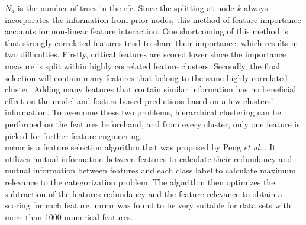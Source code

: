 $N_d$ is the number of trees in the \ac{rfc}. Since the splitting at node $k$ always incorporates the information from prior nodes, this method of feature importance accounts for non-linear feature interaction. One shortcoming of this method is that strongly correlated features tend to share their importance, which results in two difficulties. Firstly, critical features are scored lower since the importance measure is split within highly correlated feature clusters. Secondly, the final selection will contain many features that belong to the same highly correlated cluster. Adding many features that contain similar information has no beneficial effect on the model and fosters biased predictions based on a few clusters' information. To overcome these two problems, hierarchical clustering can be performed on the features beforehand, and from every cluster, only one feature is picked for further feature engineering.\\
\ac{mrmr} is a feature selection algorithm that was proposed by Peng \textit{et al.}.\cite{Peng2005}. It utilizes mutual information between features to calculate their redundancy and mutual information between features and each class label to calculate maximum relevance to the categorization problem. The algorithm then optimizes the subtraction of the features redundancy and the feature relevance to obtain a scoring for each feature. \ac{mrmr} was found to be very suitable for data sets with more than 1000 numerical features.\cite{Peng2005}
%
%
